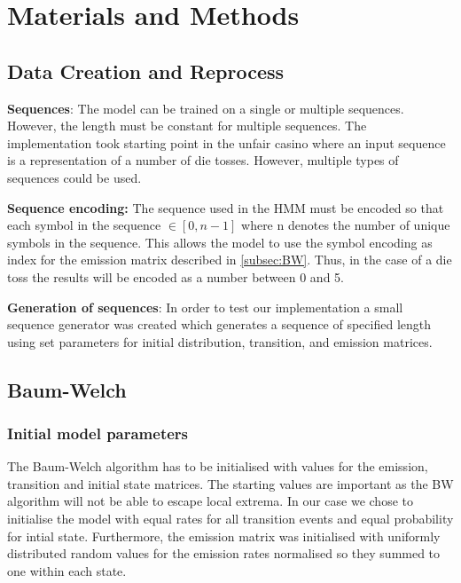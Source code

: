 
\section{Materials and Methods}

\subsection{Data Creation and Reprocess}

\textbf{Sequences}:  The model can be trained on a single or multiple sequences. However, the length must be constant for multiple sequences. The implementation took starting point in the unfair casino where an input sequence is a representation of a number of die tosses. However, multiple types of sequences could be used.

\noindent
\textbf{Sequence encoding:} The sequence used in the HMM must be encoded so that each symbol in the sequence $\in [0,n-1]$ where n denotes the number of unique symbols in the sequence. This allows the model to use the symbol encoding as index for the emission matrix described in \autoref{subsec:BW}. Thus, in the case of a die toss the results will be encoded as a number between 0 and 5.

\noindent
\textbf{Generation of sequences}: In order to test our implementation a small sequence generator was created which generates a sequence of specified length using set parameters for initial distribution, transition, and emission matrices.


\subsection{Baum-Welch} \label{subsec:BW}
\subsubsection{Initial model parameters}
The Baum-Welch algorithm has to be initialised with values for the emission, transition and initial state matrices. The starting values are important as the BW algorithm will not be able to escape local extrema. In our case we chose to initialise the model with equal rates for all transition events and equal probability for intial state. Furthermore, the emission matrix was initialised with uniformly distributed random values for the emission rates normalised so they summed to one within each state. 


